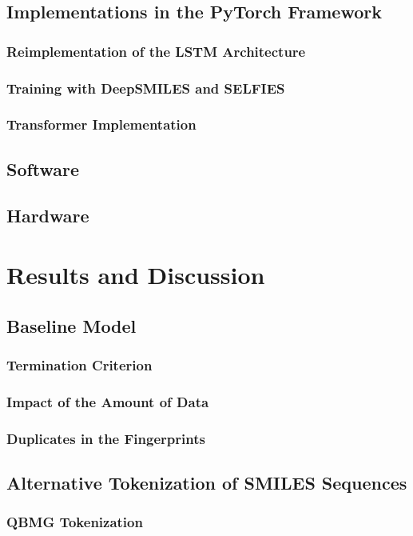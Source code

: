 \documentclass[12pt,a4paper]{report}
\begin{document}
\section{Implementations in the PyTorch Framework}
\subsection{Reimplementation of the LSTM Architecture}
\subsection{Training with DeepSMILES and SELFIES}
\subsection{Transformer Implementation}

\section{Software}
\section{Hardware}

\chapter{Results and Discussion}
\section{Baseline Model}
\subsection{Termination Criterion}
\subsection{Impact of the Amount of Data}
\subsection{Duplicates in the Fingerprints}

\section{Alternative Tokenization of SMILES Sequences}
\subsection{QBMG Tokenization}
\end{document}
